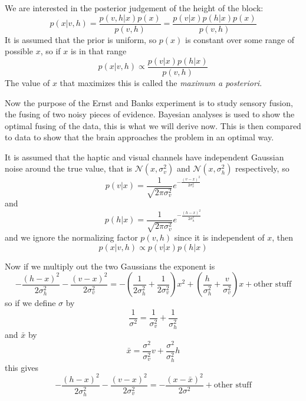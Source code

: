 \documentclass[12pt]{article}
\begin{document}
We are interested in the posterior judgement of the height of the block:
\begin{equation}
p(x|v,h)=\frac{p(v,h|x)p(x)}{p(v,h)}=\frac{p(v|x)p(h|x)p(x)}{p(v,h)}
\end{equation}
It is assumed that the prior is uniform, so $p(x)$ is constant over some range of possible $x$, so if $x$ is in that range
\begin{equation}
p(x|v,h)\propto \frac{p(v|x)p(h|x)}{p(v,h)}
\end{equation}
The value of $x$ that maximizes this is called the \textsl{maximum a posteriori}.

Now the purpose of the Ernst and Banks experiment is to study sensory
fusion, the fusing of two noisy pieces of evidence. Bayesian analyses
is used to show the optimal fusing of the data, this is what we will
derive now. This is then compared to data to show that the brain
approaches the problem in an optimal way. 

It is assumed that the haptic and visual channels have independent
Gaussian noise around the true value, that is
$\mathcal{N}(x,\sigma_v^2)$ and $\mathcal{N}(x,\sigma_h^2)$
respectively, so
\begin{equation}
p(v|x)=\frac{1}{\sqrt{2\pi\sigma_v^2}}e^{-\frac{(v-x)^2}{2\sigma_v^2}}
\end{equation}
and 
\begin{equation}
p(h|x)=\frac{1}{\sqrt{2\pi\sigma_v^2}}e^{-\frac{(h-x)^2}{2\sigma_h^2}}
\end{equation}
and we ignore the normalizing factor $p(v,h)$ since it is independent of $x$, then
\begin{equation}
p(x|v,h)\propto p(v|x)p(h|x)
\end{equation}

Now if we multiply out the two Gaussians the exponent is
\begin{equation}
-\frac{(h-x)^2}{2\sigma_h^2}-\frac{(v-x)^2}{2\sigma_v^2}=-\left(\frac{1}{2\sigma_h^2}+\frac{1}{2\sigma_v^2}\right)x^2+\left(\frac{h}{\sigma_h^2}+\frac{v}{\sigma_v^2}\right)x+\mbox{other stuff}
\end{equation}
so if we define $\sigma$ by
\begin{equation}
\frac{1}{\sigma^2}=\frac{1}{\sigma_v^2}+\frac{1}{\sigma_h^2}
\end{equation}
and $\bar{x}$ by
\begin{equation}
\bar{x}=\frac{\sigma^2}{\sigma_v^2}v+\frac{\sigma^2}{\sigma_h^2}h
\end{equation}
this gives
\begin{equation}
-\frac{(h-x)^2}{2\sigma_h^2}-\frac{(v-x)^2}{2\sigma_v^2}=-\frac{(x-\bar{x})^2}{2\sigma^2}+\mbox{other stuff}
\end{equation}
\end{document}

